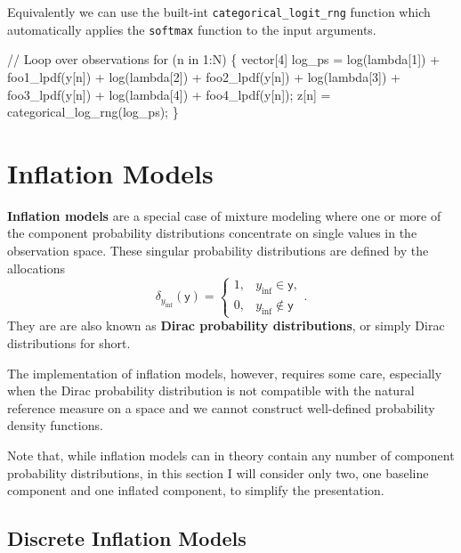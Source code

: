 \documentclass[
  letterpaper,
  DIV=11,
  numbers=noendperiod]{scrartcl}
\newenvironment{Shaded}{\begin{snugshade}}{\end{snugshade}}
\newcommand{\CommentTok}[1]{\textcolor[rgb]{0.37,0.37,0.37}{#1}}
\newcommand{\ControlFlowTok}[1]{\textcolor[rgb]{0.00,0.23,0.31}{#1}}
\newcommand{\DataTypeTok}[1]{\textcolor[rgb]{0.68,0.00,0.00}{#1}}
\newcommand{\DecValTok}[1]{\textcolor[rgb]{0.68,0.00,0.00}{#1}}
\newcommand{\NormalTok}[1]{\textcolor[rgb]{0.00,0.23,0.31}{#1}}
\begin{document}
Equivalently we can use the built-int \texttt{categorical\_logit\_rng}
function which automatically applies the \texttt{softmax} function to
the input arguments.

\begin{Shaded}
\begin{Highlighting}[]
\CommentTok{// Loop over observations}
\ControlFlowTok{for}\NormalTok{ (n }\ControlFlowTok{in} \DecValTok{1}\NormalTok{:N) \{}
  \DataTypeTok{vector}\NormalTok{[}\DecValTok{4}\NormalTok{] log\_ps =   log(lambda[}\DecValTok{1}\NormalTok{]) + foo1\_lpdf(y[n])}
\NormalTok{                     + log(lambda[}\DecValTok{2}\NormalTok{]) + foo2\_lpdf(y[n])}
\NormalTok{                     + log(lambda[}\DecValTok{3}\NormalTok{]) + foo3\_lpdf(y[n])}
\NormalTok{                     + log(lambda[}\DecValTok{4}\NormalTok{]) + foo4\_lpdf(y[n]);}
\NormalTok{  z[n] = categorical\_log\_rng(log\_ps);}
\NormalTok{\}}
\end{Highlighting}
\end{Shaded}

\section{Inflation Models}\label{sec:inflation}

\textbf{Inflation models} are a special case of mixture modeling where
one or more of the component probability distributions concentrate on
single values in the observation space. These singular probability
distributions are defined by the allocations \[
\delta_{y_{\mathrm{inf}}}( \mathsf{y} )
=
\left\{
\begin{array}{rl}
1, & y_{\mathrm{inf}} \in    \mathsf{y}, \\
0, & y_{\mathrm{inf}} \notin \mathsf{y}
\end{array}
\right. .
\] They are are also known as \textbf{Dirac probability distributions},
or simply Dirac distributions for short.

The implementation of inflation models, however, requires some care,
especially when the Dirac probability distribution is not compatible
with the natural reference measure on a space and we cannot construct
well-defined probability density functions.

Note that, while inflation models can in theory contain any number of
component probability distributions, in this section I will consider
only two, one baseline component and one inflated component, to simplify
the presentation.

\subsection{Discrete Inflation Models}\label{discrete-inflation-models}
\end{document}
